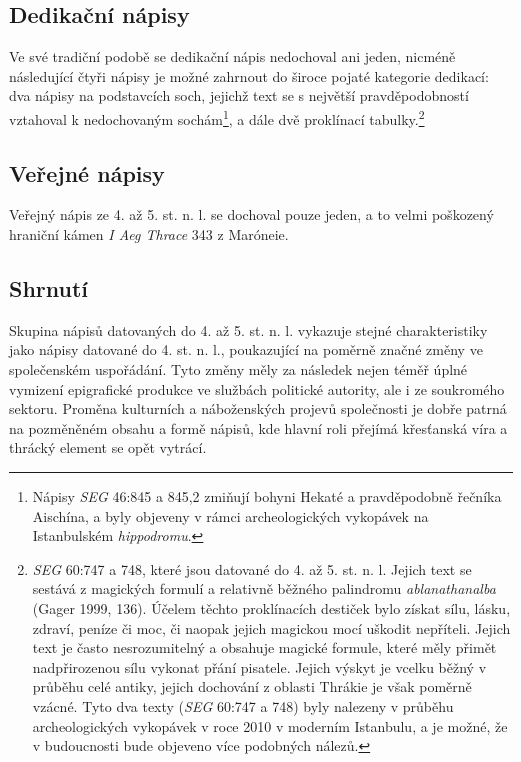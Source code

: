 \subsection[dedikační-nápisy-18]{Dedikační nápisy}

Ve své tradiční podobě se dedikační nápis nedochoval ani jeden, nicméně následující čtyři nápisy je možné zahrnout do široce pojaté kategorie dedikací: dva nápisy na podstavcích soch, jejichž text se s největší pravděpodobností vztahoval k nedochovaným sochám\footnote{Nápisy {\em SEG} 46:845 a 845,2 zmiňují bohyni Hekaté a pravděpodobně řečníka Aischína, a byly objeveny v rámci archeologických vykopávek na Istanbulském {\em hippodromu}.}, a dále dvě proklínací tabulky.\footnote{{\em SEG} 60:747 a 748, které jsou datované do 4. až 5. st. n. l. Jejich text se sestává z magických formulí a relativně běžného palindromu {\em ablanathanalba} (Gager 1999, 136). Účelem těchto proklínacích destiček bylo získat sílu, lásku, zdraví, peníze či moc, či naopak jejich magickou mocí uškodit nepříteli. Jejich text je často nesrozumitelný a obsahuje magické formule, které měly přimět nadpřirozenou sílu vykonat přání pisatele. Jejich výskyt je vcelku běžný v průběhu celé antiky, jejich dochování z oblasti Thrákie je však poměrně vzácné. Tyto dva texty ({\em SEG} 60:747 a 748) byly nalezeny v průběhu archeologických vykopávek v roce 2010 v moderním Istanbulu, a je možné, že v budoucnosti bude objeveno více podobných nálezů.}

\subsection[veřejné-nápisy-18]{Veřejné nápisy}

Veřejný nápis ze 4. až 5. st. n. l. se dochoval pouze jeden, a to velmi poškozený hraniční kámen {\em I Aeg Thrace} 343 z Maróneie.

\subsection[shrnutí-22]{Shrnutí}

Skupina nápisů datovaných do 4. až 5. st. n. l. vykazuje stejné charakteristiky jako nápisy datované do 4. st. n. l., poukazující na poměrně značné změny ve společenském uspořádání. Tyto změny měly za následek nejen téměř úplné vymizení epigrafické produkce ve službách politické autority, ale i ze soukromého sektoru. Proměna kulturních a náboženských projevů společnosti je dobře patrná na pozměněném obsahu a formě nápisů, kde hlavní roli přejímá křesťanská víra a thrácký element se opět vytrácí.

